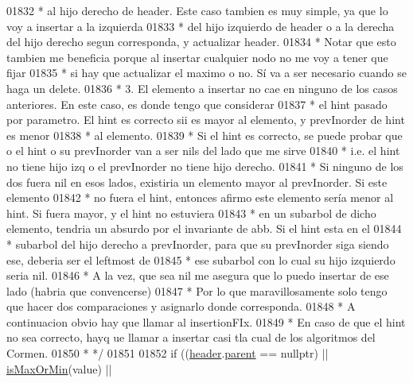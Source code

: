 \begin{DoxyCode}
01832 \textcolor{comment}{            * al hijo derecho de header. Este caso tambien es muy simple, ya que lo voy a insertar a la
       izquierda}
01833 \textcolor{comment}{            * del hijo izquierdo de header o a la derecha del hijo derecho segun corresponda, y actualizar
       header.}
01834 \textcolor{comment}{            * Notar que esto tambien me beneficia porque al insertar cualquier nodo no me voy a tener que
       fijar}
01835 \textcolor{comment}{            * si hay que actualizar el maximo o no. Sí va a ser necesario cuando se haga un delete.}
01836 \textcolor{comment}{            * 3. El elemento a insertar no cae en ninguno de los casos anteriores. En este caso, es donde
       tengo que considerar}
01837 \textcolor{comment}{            * el hint pasado por parametro. El hint es correcto sii es mayor al elemento, y prevInorder de
       hint es menor}
01838 \textcolor{comment}{            * al elemento.}
01839 \textcolor{comment}{            * Si el hint es correcto, se puede probar que o el hint o su prevInorder van a ser nils del
       lado que me sirve}
01840 \textcolor{comment}{            * i.e. el hint no tiene hijo izq o el prevInorder no tiene hijo derecho.}
01841 \textcolor{comment}{            * Si ninguno de los dos fuera nil en esos lados, existiria un elemento mayor al prevInorder. Si
       este elemento}
01842 \textcolor{comment}{            * no fuera el hint, entonces afirmo este elemento sería menor al hint. Si fuera mayor, y el
       hint no estuviera}
01843 \textcolor{comment}{            * en un subarbol de dicho elemento, tendria un absurdo por el invariante de abb. Si el hint
       esta en el}
01844 \textcolor{comment}{            * subarbol del hijo derecho a prevInorder, para que su prevInorder siga siendo ese, deberia ser
       el leftmost de}
01845 \textcolor{comment}{            * ese subarbol con lo cual su hijo izquierdo seria nil.}
01846 \textcolor{comment}{            * A la vez, que sea nil me asegura que lo puedo insertar de ese lado (habria que convencerse)}
01847 \textcolor{comment}{            * Por lo que maravillosamente solo tengo que hacer dos comparaciones y asignarlo donde
       corresponda.}
01848 \textcolor{comment}{            * A continuacion obvio hay que llamar al insertionFIx.}
01849 \textcolor{comment}{            * En caso de que el hint no sea correcto, hayq ue llamar a insertar casi tla cual de los
       algoritmos del Cormen.}
01850 \textcolor{comment}{            * */}
01851 
01852             \textcolor{keywordflow}{if} ((\hyperlink{classaed2_1_1map_a92d93f905c8ad73fba18fdc7e8915cce_a92d93f905c8ad73fba18fdc7e8915cce}{header}.\hyperlink{structaed2_1_1map_1_1Node_ab6a5f9e471b311755e4a56834086cb90_ab6a5f9e471b311755e4a56834086cb90}{parent} == \textcolor{keyword}{nullptr}) || \hyperlink{classaed2_1_1map_a81db4ead6daafe94938d5410173bdb6c_a81db4ead6daafe94938d5410173bdb6c}{isMaxOrMin}(value) || 

\end{DoxyCode}
